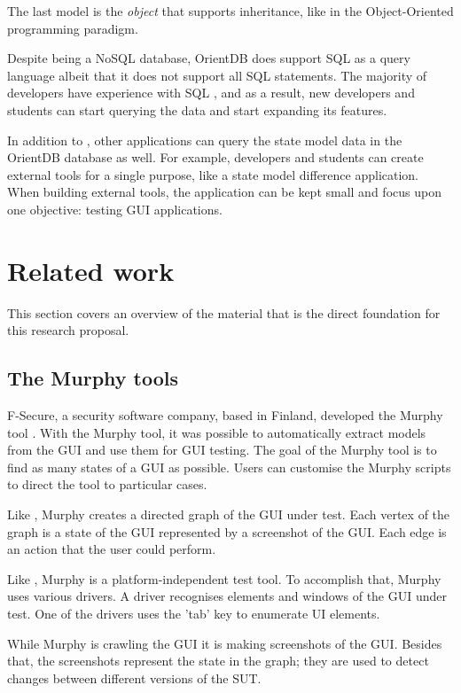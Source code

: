 The last model is the \hypertarget{db:object}{\emph{object}} that supports inheritance, like in the Object-Oriented programming paradigm.\par

Despite being a NoSQL database, OrientDB does support SQL as a query language \cite{sql-lang} albeit that it does not support all SQL statements. The majority of developers have experience with SQL \cite{sql-stats}, and as a result, new developers and students can start querying the \testar data and start expanding its features.\par

In addition to \testar, other applications can query the state model data in the OrientDB database as well. For example, developers and students can create external tools for a single purpose, like a state model difference application. When building external tools, the \testar application can be kept small and focus upon one objective: testing GUI applications. 

\section{Related work} \label{releatedWork}
This section covers an overview of the material that is the direct foundation for this research proposal.


\subsection{The Murphy tools} \label{murphy-tools}
F-Secure, a security software company, based in Finland, developed the Murphy tool \cite{aho2013industrial}. With the Murphy tool, it was possible to automatically extract models from the GUI and use them for GUI testing. The goal of the Murphy tool is to find as many states of a GUI as possible. Users can customise the Murphy scripts to direct the tool to particular cases. 

Like \testar, Murphy creates a directed graph of the GUI under test. Each vertex of the graph is a state of the GUI represented by a screenshot of the GUI. Each edge is an action that the user could perform. 

Like \testar, Murphy is a platform-independent test tool. To accomplish that, Murphy uses various drivers. A driver recognises elements and windows of the GUI under test. One of the drivers uses the 'tab' key to enumerate UI elements. 

While Murphy is crawling the GUI it is making screenshots of the GUI. Besides that, the screenshots represent the state in the graph; they are used to detect changes between different versions of the SUT. 


